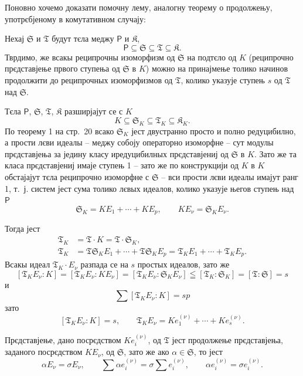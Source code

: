 \documentclass[11pt]{article}
\begin{document}
Поновно хочемо доказати помочну лему, аналогну теорему о продолжењу, употрєбјеному в комутативном случају:

Нехај \(\mathfrak S\) и \(\mathfrak T\) будут тєла меджу \(\mathsf P\) и \(\mathfrak K\),
\[
\mathsf P \subseteq \mathfrak S \subseteq \mathfrak T \subseteq \mathfrak K.
\]
Тврдимо, же всакы реципрочны изоморфизм од \(\mathfrak S\) на подтєло од \(K\) (реципрочно прєдставјење првого ступења од \(\mathfrak S\) в \(K\)) можно на принајмење толико начинов продолжити до реципрочных изоморфизмов од \(\mathfrak T\), колико указује ступењ \(s\) од \(\mathfrak T\) над \(\mathfrak S\).

Тєла \(\mathsf P\), \(\mathfrak S\), \(\mathfrak T\), \(\mathfrak K\) разширјајут се с \(K\)
\[
K\subseteq \mathfrak S_K\subseteq \mathfrak T_K\subseteq \mathfrak K_K.
\]
По теорему 1 на стр.~20 всако \(\mathfrak S_K\) јест двустранно просто и полно редуцибилно, а прости лєви идеалы -- меджу собоју операторно изоморфне -- сут модулы прєдставјења за једину класу иредуцибилных прєдставјениј од \(\mathfrak S\) в \(K\). Зато же та класа прєдставјениј имаје ступењ 1 -- зато же по конструкцији од \(K\) в \(K\) обстајајут тєла реципрочно изоморфне с \(\mathfrak S\) -- вси прости лєви идеалы имајут ранг 1, т.~ј. систем јест сума толико лєвых идеалов, колико указује његов ступењ над \(\mathsf P\)
\[
\mathfrak S_K=K E_1+\cdots+K E_p,\qquad K E_\nu=\mathfrak S_K E_\nu.
\]

Тогда јест
\[
\begin{aligned}
\mathfrak T_K&=\mathfrak T\cdot K=\mathfrak T\cdot \mathfrak S_K,\\
\mathfrak T_K&=\mathfrak T\mathfrak S_K E_1+\cdots+\mathfrak T\mathfrak S_K E_p
              =\mathfrak T_K E_1+\cdots+\mathfrak T_K E_p.
\end{aligned}
\]
Всакы идеал \(\mathfrak T_K\cdot E_\nu\) разпада се на \(s\) простых идеалов, зато же
\[
[\mathfrak T_K E_\nu:K]=[\mathfrak T_K E_\nu:K E_\nu]=[\mathfrak T_K E_\nu:\mathfrak S_K E_\nu]\leqq[\mathfrak T_K:\mathfrak S_K]=[\mathfrak T:\mathfrak S]=s
\]
и
\[
\sum [\mathfrak T_K E_\nu:K]=sp
\]
зато
\[
[\mathfrak T_K E_\nu:K]=s,
\qquad
\mathfrak T_K E_\nu=K e_1^{(\nu)}+\cdots+K e_s^{(\nu)}.
\]

Прєдставјење, дано посрєдством \(K e_i^{(\nu)}\), од \(\mathfrak T\) јест продолжење прєдставјења, заданого посрєдством \(K E_\nu\), од \(\mathfrak S\), зато же ако \(\alpha\in \mathfrak S\), то јест
\[
\alpha E_\nu=\sigma E_\nu,\qquad
\sum \alpha e_i^{(\nu)}=\sigma\sum e_i^{(\nu)},\qquad
\alpha e_i^{(\nu)}=\sigma e_i^{(\nu)}.
\]
\end{document}
